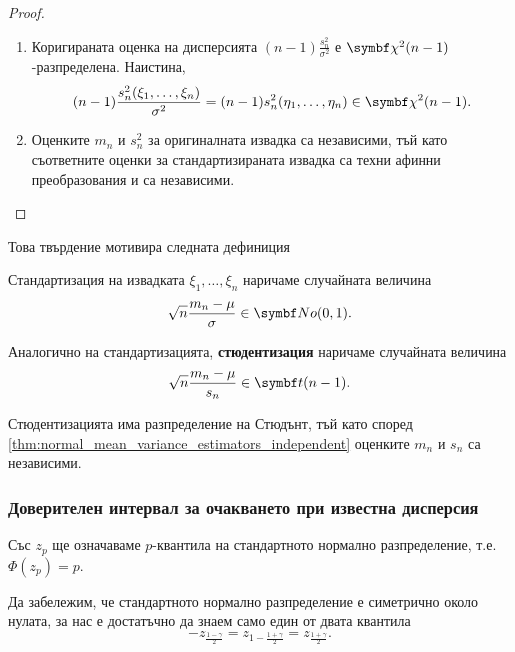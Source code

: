 \documentclass{../../common/topic}
\begin{document}
\begin{proof}
\begin{enumerate}
    \item Коригираната оценка на дисперсията \( (n-1) \frac {s_n^2} {\sigma^2} \) е \( \distr{\chi^2}(n-1) \)-разпределена. Наистина,
    \begin{equation*}
      (n-1) \frac {s_n^2(\xi_1, \ldots, \xi_n)} {\sigma^2}
      =
      (n-1) s_n^2(\eta_1, \ldots, \eta_n)
      \in
      \distr{\chi^2}(n - 1).
    \end{equation*}

    \item Оценките \( m_n \) и \( s_n^2 \) за оригиналната извадка са независими, тъй като съответните оценки за стандартизираната извадка са техни афинни преобразования и са независими.
  \end{enumerate}
\end{proof}

Това твърдение мотивира следната дефиниция
\begin{definition}
  Стандартизация на извадката \( \xi_1, \ldots, \xi_n \) наричаме случайната величина
  \begin{equation*}
    \sqrt n \frac {m_n - \mu} \sigma \in \distr{No}(0, 1).
  \end{equation*}

  Аналогично на стандартизацията, \textbf{стюдентизация} наричаме случайната величина
  \begin{equation*}
    \sqrt n \frac {m_n - \mu} {s_n} \in \distr{t}(n - 1).
  \end{equation*}
\end{definition}

\begin{remark}
  Стюдентизацията има разпределение на Стюдънт, тъй като според \cref{thm:normal_mean_variance_estimators_independent} оценките \( m_n \) и \( s_n \) са независими.
\end{remark}

\subsubsection{Доверителен интервал за очакването при известна дисперсия}

Със \( z_p \) ще означаваме \( p \)-квантила на стандартното нормално разпределение, т.е. \( \Phi(z_p) = p \).

Да забележим, че стандартното нормално разпределение е симетрично около нулата, за нас е достатъчно да знаем само един от двата квантила
\begin{equation*}
  -z_{\frac {1-\gamma} 2}
  =
  z_{1-\frac {1+\gamma} 2}
  =
  z_{\frac {1+\gamma} 2}.
\end{equation*}
\end{document}
